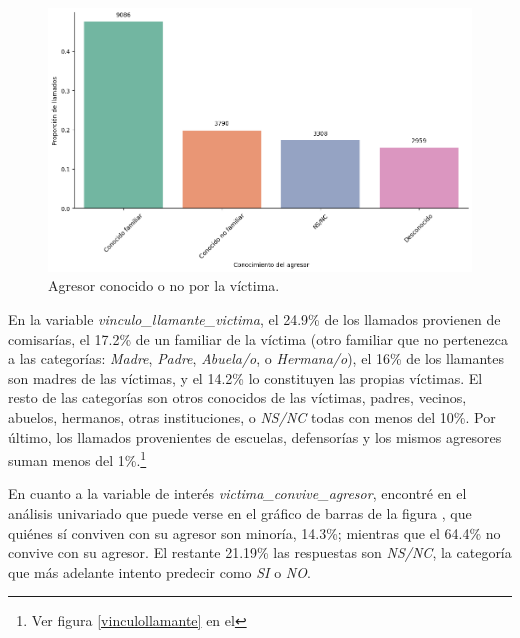 \documentclass[10 pt]{article}
\begin{document}
    \begin{figure}[H]
        \begin{center}
        \includegraphics[scale=.5]{images/latex_agresor_conocido_no.png}
        \caption{Agresor conocido o no por la víctima.}
        \label{conocidodesconocido}
        \end{center}
        \end{figure}




 En la variable \textit{vinculo\_llamante\_victima}, el 24.9\% de los llamados provienen de comisarías, el 17.2\% de un familiar de la víctima (otro familiar que no pertenezca a las categorías: \textit{Madre}, \textit{Padre}, \textit{Abuela/o}, o \textit{Hermana/o}), el 16\% de los llamantes son madres de las víctimas, y el 14.2\% lo constituyen las propias víctimas. El resto de las categorías son otros conocidos de las víctimas, padres, vecinos, abuelos, hermanos, otras instituciones, o \textit{NS/NC} todas con menos del 10\%. Por último, los llamados provenientes de escuelas, defensorías y los mismos agresores suman menos del 1\%.\footnote{Ver figura \ref{vinculollamante} en el }



En cuanto a la variable de interés \textit{victima\_convive\_agresor}, encontré en el análisis univariado que puede verse en el gráfico de barras de la figura , que quiénes sí conviven con su agresor son minoría, 14.3\%; mientras que el 64.4\% no convive con su agresor. El restante 21.19\% las respuestas son \textit{NS/NC}, la categoría que más adelante intento predecir como \textit{SI} o \textit{NO}.  
\end{document}
